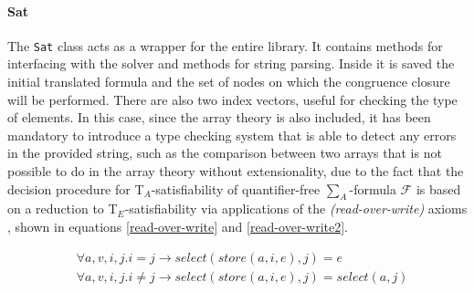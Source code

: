 \documentclass{IEEEtran}
\begin{document}
\paragraph{Sat}
The \verb|Sat| class acts as a wrapper for the entire library. It contains methods for interfacing with the solver and methods for string parsing. Inside it is saved the initial translated formula and the set of nodes on which the congruence closure will be performed. There are also two index vectors, useful for checking the type of elements. In this case, since the array theory is also included, it has been mandatory to introduce a type checking system that is able to detect any errors in the provided string, such as the comparison between two arrays that is not possible to do in the array theory without extensionality, due to the fact that the decision procedure for T$_A$-satisfiability of quantifier-free $\sum_A$-formula $\mathcal{F}$ is based on a reduction to T$_E$-satisfiability via applications of the \textit{(read-over-write)} axioms \cite{10.5555/1324777}, shown in equations \ref{read-over-write} and \ref{read-over-write2}.

\begin{align}
	\label{read-over-write}
	&\forall a,v,i,j. i = j \to select(store(a,i,e),j) = e \\
	\label{read-over-write2}
	&\forall a,v,i,j. i \ne j \to select(store(a,i,e),j) = select(a,j)
\end{align}
\end{document}
